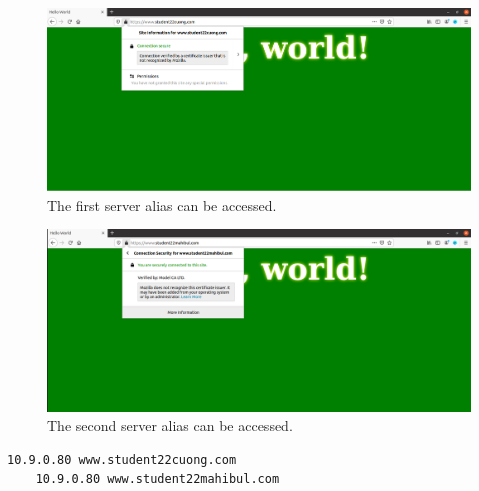 \begin{figure}
    \centering
    \includegraphics[height=\textheight,width=\textwidth,keepaspectratio]
    {figures/https_work_cuong.png}
    \caption{The first server alias can be accessed.}
    \label{fig:https_work_cuong}
\end{figure}

\begin{figure}
    \centering
    \includegraphics[height=\textheight,width=\textwidth,keepaspectratio]
    {figures/https_work_mahibul.png}
    \caption{The second server alias can be accessed.}
    \label{fig:https_work_mahibul}
\end{figure}

\begin{lstlisting}[caption=Append two alternative names to a list of known hosts.,
    label={lst:add_alt_name}]
    10.9.0.80 www.student22cuong.com
    10.9.0.80 www.student22mahibul.com
\end{lstlisting}

